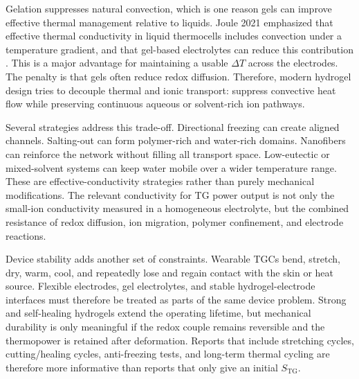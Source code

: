 \documentclass[a4paper,12pt]{report}
\begin{document}
Gelation suppresses natural convection, which is one reason gels can improve
effective thermal management relative to liquids. Joule 2021 emphasized that
effective thermal conductivity in liquid thermocells includes convection under a
temperature gradient, and that gel-based electrolytes can reduce this
contribution \citep{duan2021liquid}. This is a major advantage for maintaining
a usable $\Delta T$ across the electrodes. The penalty is that gels often reduce
redox diffusion. Therefore, modern hydrogel design tries to decouple thermal
and ionic transport: suppress convective heat flow while preserving continuous
aqueous or solvent-rich ion pathways.

Several strategies address this trade-off. Directional freezing can create
aligned channels. Salting-out can form polymer-rich and water-rich domains.
Nanofibers can reinforce the network without filling all transport space.
Low-eutectic or mixed-solvent systems can keep water mobile over a wider
temperature range. These are effective-conductivity strategies rather than
purely mechanical modifications.
The relevant conductivity for TG power output is not
only the small-ion conductivity measured in a homogeneous electrolyte, but the
combined resistance of redox diffusion, ion migration, polymer confinement, and
electrode reactions.

Device stability adds another set of constraints. Wearable TGCs bend, stretch,
dry, warm, cool, and repeatedly lose and regain contact with the skin or heat
source. Flexible electrodes, gel electrolytes, and stable hydrogel-electrode
interfaces must therefore be treated as parts of the same device problem.
Strong and self-healing hydrogels
extend the operating lifetime, but mechanical durability is only meaningful if
the redox couple remains reversible and the thermopower is retained after
deformation. Reports that include stretching cycles, cutting/healing cycles,
anti-freezing tests, and long-term thermal cycling are therefore more
informative than reports that only give an initial $S_{\mathrm{TG}}$.
\end{document}
